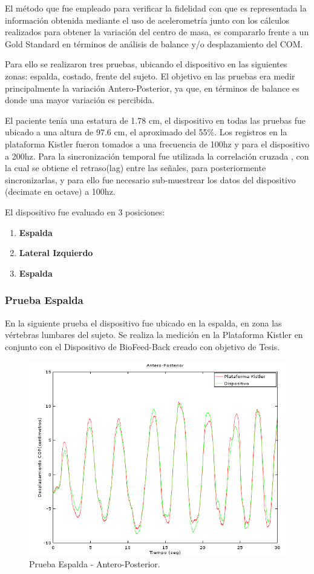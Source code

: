 \documentclass[12pt,a4paper]{article}
\newcommand{\nombreDispositivo}{Dispositivo de BioFeed-Back }
\begin{document}
El método que fue empleado para verificar la fidelidad con que es representada la información obtenida mediante el uso de acelerometría junto con los cálculos realizados para obtener la variación del centro de masa, es compararlo frente a un Gold Standard en términos de análisis de balance y/o desplazamiento del COM.

Para ello se realizaron tres pruebas, ubicando el dispositivo en las siguientes zonas: espalda, costado, frente del sujeto.
El objetivo en las pruebas era medir principalmente la variación Antero-Posterior, ya que, en términos de balance es donde una mayor variación es percibida.

El paciente tenía una estatura de 1.78 cm, el dispositivo en todas las pruebas fue ubicado a una altura de 97.6 cm, el aproximado del 55\%.
Los registros en la plataforma Kistler fueron tomados a una frecuencia de 100hz y para el dispositivo a 200hz. 
Para la sincronización temporal fue utilizada la correlación cruzada \cite{correlacionCruzada}, con la cual se obtiene el retraso(lag) entre las señales, para posteriormente sincronizarlas, y para ello fue necesario sub-muestrear los datos del dispositivo (decimate en octave) a 100hz.

El dispositivo fue evaluado en 3 posiciones:
\begin{enumerate}
	\item \textbf{Espalda} 
	\item \textbf{Lateral Izquierdo}
	\item \textbf{Espalda}
\end{enumerate}

\newpage
\subsubsection{Prueba Espalda} En la siguiente prueba el dispositivo fue ubicado en la espalda, en zona las vértebras lumbares del sujeto. Se realiza la medición en la Plataforma Kistler en conjunto con el \nombreDispositivo creado con objetivo de Tesis.
		

\begin{figure}[H]
	\centering
	\includegraphics[width=1\linewidth]{images/pruebas/Espalda/Antero-Posterior}
	\caption{Prueba Espalda - Antero-Posterior.}
	\label{fig:anteroPosteriorEspalda}
\end{figure}
\end{document}
